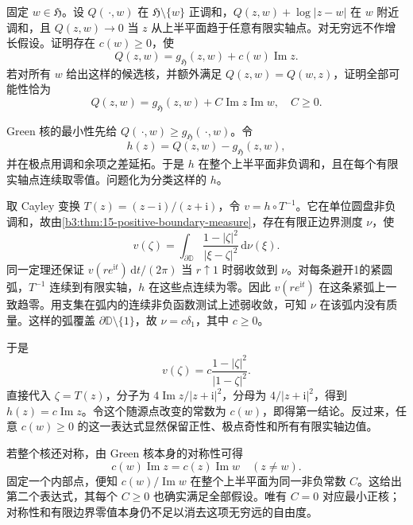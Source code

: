 \begin{exercise}[半平面中全部正候选核的分类]\label{b3:ex:17-draft-08}
固定 \(w\in\mathfrak H\)。设 \(Q(\,\cdot,w)\) 在 \(\mathfrak H\setminus\{w\}\) 正调和，\(Q(z,w)+\log|z-w|\) 在 \(w\) 附近调和，且 \(Q(z,w)\to0\) 当 \(z\) 从上半平面趋于任意有限实轴点。对无穷远不作增长假设。证明存在 \(c(w)\ge0\)，使
\[
 Q(z,w)=g_{\mathfrak H}(z,w)+c(w)\operatorname{Im}z.
\]
若对所有 \(w\) 给出这样的候选核，并额外满足 \(Q(z,w)=Q(w,z)\)，证明全部可能性恰为
\[
 Q(z,w)=g_{\mathfrak H}(z,w)
             +C\operatorname{Im}z\operatorname{Im}w,\quad C\ge0.
\]
\end{exercise}
\begin{solution}
Green 核的最小性先给 \(Q(\,\cdot,w)\ge g_{\mathfrak H}(\,\cdot,w)\)。令
\[
 h(z)=Q(z,w)-g_{\mathfrak H}(z,w),
\]
并在极点用调和余项之差延拓。于是 \(h\) 在整个上半平面非负调和，且在每个有限实轴点连续取零值。问题化为分类这样的 \(h\)。

取 Cayley 变换 \(T(z)=(z-\mathrm i)/(z+\mathrm i)\)，令 \(v=h\circ T^{-1}\)。它在单位圆盘非负调和，故由\cref{b3:thm:15-positive-boundary-measure}，存在有限正边界测度 \(\nu\)，使
\[
 v(\zeta)=\int_{\partial\mathbb D}
               \frac{1-|\zeta|^2}{|\xi-\zeta|^2}\,\mathrm d\nu(\xi).
\]
同一定理还保证 \(v(re^{\mathrm it})\,\mathrm dt/(2\pi)\) 当 \(r\uparrow1\) 时弱收敛到 \(\nu\)。对每条避开1的紧圆弧，\(T^{-1}\) 连续到有限实轴，\(h\) 在这些点连续为零。因此 \(v(re^{\mathrm it})\) 在这条紧弧上一致趋零。用支集在弧内的连续非负函数测试上述弱收敛，可知 \(\nu\) 在该弧内没有质量。这样的弧覆盖 \(\partial\mathbb D\setminus\{1\}\)，故 \(\nu=c\delta_1\)，其中 \(c\ge0\)。

于是
\[
 v(\zeta)=c\frac{1-|\zeta|^2}{|1-\zeta|^2}.
\]
直接代入 \(\zeta=T(z)\)，分子为 \(4\operatorname{Im}z/|z+\mathrm i|^2\)，分母为 \(4/|z+\mathrm i|^2\)，得到 \(h(z)=c\operatorname{Im}z\)。令这个随源点改变的常数为 \(c(w)\)，即得第一结论。反过来，任意 \(c(w)\ge0\) 的这一表达式显然保留正性、极点奇性和所有有限实轴边值。

若整个核还对称，由 Green 核本身的对称性可得
\[
 c(w)\operatorname{Im}z=c(z)\operatorname{Im}w
 \quad(z\ne w).
\]
固定一个内部点，便知 \(c(w)/\operatorname{Im}w\) 在整个上半平面为同一非负常数 \(C\)。这给出第二个表达式，其每个 \(C\ge0\) 也确实满足全部假设。唯有 \(C=0\) 对应最小正核；对称性和有限边界零值本身仍不足以消去这项无穷远的自由度。
\end{solution}
